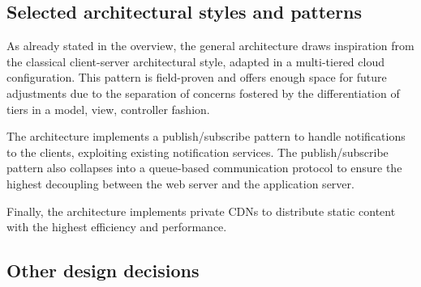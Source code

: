 \documentclass[../../main.tex]{subfiles}
\begin{document}
\subsection{Selected architectural styles and patterns}
    As already stated in the overview, the general architecture draws inspiration from the classical client-server architectural style, adapted in a multi-tiered cloud configuration.  This pattern is field-proven and offers enough space for future adjustments due to the separation of concerns fostered by the differentiation of tiers in a model, view, controller fashion.

    The architecture implements a publish/subscribe pattern to handle notifications to the clients, exploiting existing notification services. 
    The publish/subscribe pattern also collapses into a queue-based communication protocol to ensure the highest decoupling between the web server and the application server.

    Finally, the architecture implements private CDNs to distribute static content with the highest efficiency and performance.

\subsection{Other design decisions}
\end{document}
